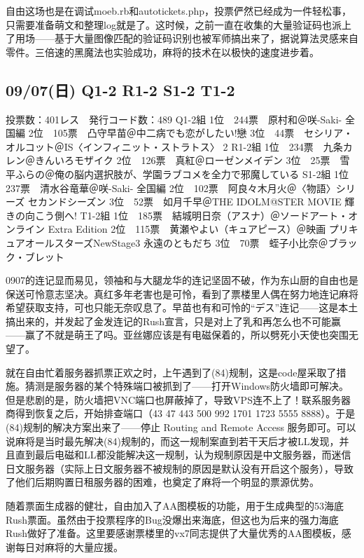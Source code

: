 自由这场也是在调试moeb.rb和autotickets.php，投票俨然已经成为一件轻松事，只需要准备萌文和整理log就是了。这时候，之前一直在收集的大量验证码也派上了用场——基于大量图像匹配的验证码识别也被军师搞出来了，据说算法灵感来自零件。三倍速的黑魔法也实验成功，麻将的技术在以极快的速度进步着。

\subsection{09/07(日) Q1-2 R1-2 S1-2 T1-2}

	投票数：401レス　発行コード数：489
	Q1-2組
	1位　244票　原村和＠咲-Saki- 全国編
	2位　105票　凸守早苗＠中二病でも恋がしたい!戀
	3位　44票　セシリア・オルコット＠IS〈インフィニット・ストラトス〉 2
	R1-2組
	1位　234票　九条カレン＠きんいろモザイク
	2位　126票　真紅＠ローゼンメイデン
	3位　25票　雪平ふらの＠俺の脳内選択肢が、学園ラブコメを全力で邪魔している
	S1-2組
	1位　237票　清水谷竜華＠咲-Saki- 全国編
	2位　102票　阿良々木月火＠〈物語〉シリーズ セカンドシーズン
	3位　52票　如月千早＠THE IDOLM@STER MOVIE 輝きの向こう側へ!
	T1-2組
	1位　185票　結城明日奈（アスナ）＠ソードアート・オンライン Extra Edition
	2位　115票　黄瀬やよい（キュアピース）＠映画 プリキュアオールスターズNewStage3 永遠のともだち
	3位　70票　蛭子小比奈＠ブラック・ブレット

0907的连记显而易见，领袖和与大腿龙华的连记坚固不破，作为东山厨的自由也是保送可怜意志坚决。真红多年老害也是可怜，看到了票楼里人偶在努力地连记麻将希望获取支持，可也只能无奈叹息了。早苗也有和可怜的“デス”连记——这是本土搞出来的，并发起了金发连记的Rush宣言，只是对上了乳和再怎么也不可能赢——赢了不就是萌王了吗。亚丝娜应该是有电磁保着的，所以劈死小天使也突围无望了。

就在自由忙着服务器抓票正欢之时，上午遇到了(84)规制，这是code屋采取了措施。猜测是服务器的某个特殊端口被抓到了——打开Windows防火墙即可解决。但是悲剧的是，防火墙把VNC端口也屏蔽掉了，导致VPS连不上了！联系服务器商得到恢复之后，开始排查端口（43 47 443 500 992 1701 1723 5555 8888）。于是(84)规制的解决方案出来了——停止 Routing and Remote Access 服务即可。可以说麻将是当时最先解决(84)规制的，而这一规制案直到若干天后才被LL发现，并且直到最后电磁和LL都没能解决这一规制，认为规制原因是中文服务器，而迷信日文服务器（实际上日文服务器不被规制的原因是默认没有开启这个服务），导致了他们后期购置日租服务器的困难，也奠定了麻将一个明显的票源优势。

随着票面生成器的健壮，自由加入了AA图模板的功能，用于生成典型的53海底Rush票面。虽然由于投票程序的Bug没爆出来海底，但这也为后来的强力海底Rush做好了准备。这里要感谢票楼里的vx7同志提供了大量优秀的AA图模板，感谢每日对麻将的大量应援。

